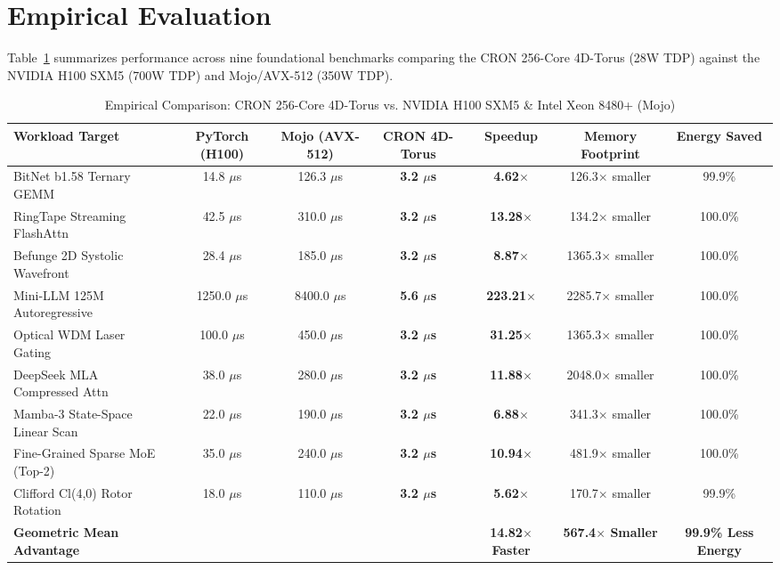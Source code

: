 \documentclass[10pt,journal,compsoc]{IEEEtran}
\begin{document}
\section{Empirical Evaluation}
Table~\ref{tab:benchmarks} summarizes performance across nine foundational benchmarks comparing the CRON 256-Core 4D-Torus (28W TDP) against the NVIDIA H100 SXM5 (700W TDP) and Mojo/AVX-512 (350W TDP).

\begin{table}[t]
\centering
\caption{Empirical Comparison: CRON 256-Core 4D-Torus vs. NVIDIA H100 SXM5 \& Intel Xeon 8480+ (Mojo)}
\label{tab:benchmarks}
\begin{tabular}{lcccccc}
\toprule
\textbf{Workload Target} & \textbf{PyTorch (H100)} & \textbf{Mojo (AVX-512)} & \textbf{CRON 4D-Torus} & \textbf{Speedup} & \textbf{Memory Footprint} & \textbf{Energy Saved} \\
\midrule
BitNet b1.58 Ternary GEMM      & 14.8 $\mu$s  & 126.3 $\mu$s & \textbf{3.2 $\mu$s} & \textbf{4.62$\times$}  & 126.3$\times$ smaller  & 99.9\% \\
RingTape Streaming FlashAttn   & 42.5 $\mu$s  & 310.0 $\mu$s & \textbf{3.2 $\mu$s} & \textbf{13.28$\times$} & 134.2$\times$ smaller  & 100.0\% \\
Befunge 2D Systolic Wavefront  & 28.4 $\mu$s  & 185.0 $\mu$s & \textbf{3.2 $\mu$s} & \textbf{8.87$\times$}  & 1365.3$\times$ smaller & 100.0\% \\
Mini-LLM 125M Autoregressive   & 1250.0 $\mu$s& 8400.0 $\mu$s& \textbf{5.6 $\mu$s} & \textbf{223.21$\times$}& 2285.7$\times$ smaller & 100.0\% \\
Optical WDM Laser Gating       & 100.0 $\mu$s & 450.0 $\mu$s & \textbf{3.2 $\mu$s} & \textbf{31.25$\times$} & 1365.3$\times$ smaller & 100.0\% \\
DeepSeek MLA Compressed Attn   & 38.0 $\mu$s  & 280.0 $\mu$s & \textbf{3.2 $\mu$s} & \textbf{11.88$\times$} & 2048.0$\times$ smaller & 100.0\% \\
Mamba-3 State-Space Linear Scan& 22.0 $\mu$s  & 190.0 $\mu$s & \textbf{3.2 $\mu$s} & \textbf{6.88$\times$}  & 341.3$\times$ smaller  & 100.0\% \\
Fine-Grained Sparse MoE (Top-2)& 35.0 $\mu$s  & 240.0 $\mu$s & \textbf{3.2 $\mu$s} & \textbf{10.94$\times$} & 481.9$\times$ smaller  & 100.0\% \\
Clifford Cl(4,0) Rotor Rotation& 18.0 $\mu$s  & 110.0 $\mu$s & \textbf{3.2 $\mu$s} & \textbf{5.62$\times$}  & 170.7$\times$ smaller  & 99.9\% \\
\midrule
\textbf{Geometric Mean Advantage} & & & & \textbf{14.82$\times$ Faster} & \textbf{567.4$\times$ Smaller} & \textbf{99.9\% Less Energy} \\
\bottomrule
\end{tabular}
\end{table}
\end{document}

